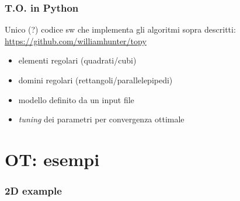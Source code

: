 \documentclass{beamer}
\begin{document}
\begin{frame}
	\frametitle{T.O. in Python}
	Unico (?) codice sw che implementa gli algoritmi sopra descritti:\\
	\url{https://github.com/williamhunter/topy}
	
	\begin{itemize}
		\item elementi regolari (quadrati/cubi)
		\item domini regolari (rettangoli/parallelepipedi)
		\item modello definito da un input file
		\item \textit{tuning} dei parametri per convergenza ottimale
	\end{itemize}
	
\end{frame}


\section{OT: esempi}

\begin{frame}
	\frametitle{2D example}
	\centering
\end{frame}
\end{document}
